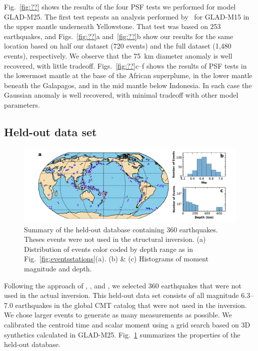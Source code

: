 \documentclass[extra,mreferee]{gji}
\begin{document}
Fig.~\ref{fig:??} shows the results of the four PSF tests we performed for model GLAD-M25.
The first test repeats an analysis performed by~\cite{bozdaug2016global} for GLAD-M15 in the upper mantle underneath Yellowstone.
That test was based on 253 earthquakes,
and Figs.~\ref{fig:??}a and~\ref{fig:??}b show our results for the same location based on half our dataset (720 events) and the full dataset (1,480 events), respectively.
We observe that the 75~km diameter anomaly is well recovered, with little tradeoff.
Figs.~\ref{fig:??}c--f shows the results of PSF tests in the lowermost mantle at the base of the African superplume,
in the lower mantle beneath the Galapagos,
and in the mid mantle below Indonesia.
In each case the Gaussian anomaly is well recovered, with minimal tradeoff with other model parameters.

\subsection{Held-out data set}

\begin{figure}
  \centering
  \includegraphics[width=\textwidth]{figures/events_360.pdf}
  \caption{\small{Summary of the held-out database containing 360 earthquakes. Theses events were not used in the structural inversion. (a) Distribution of events color coded by depth range as in Fig.~\ref{fig:eventsstations}(a). (b) \& (c) Histograms of moment magnitude and depth.}}
  \label{fig:events_360}
\end{figure}

Following the approach of \cite{tape2009adjoint}, \cite{chen2015multiparameter},
and \cite{bozdaug2016global}, we selected 360 earthquakes that were not used
in the actual inversion. This held-out data set consists of all magnitude 6.3--7.0
earthquakes in the global CMT catalog that were not used in the inversion.
We chose larger events to generate as many measurements as possible.
We calibrated the centroid time and scalar moment using a grid search based on
3D synthetics calculated in GLAD-M25.
Fig.~\ref{fig:events_360} summarizes the properties of the held-out database.
\end{document}
